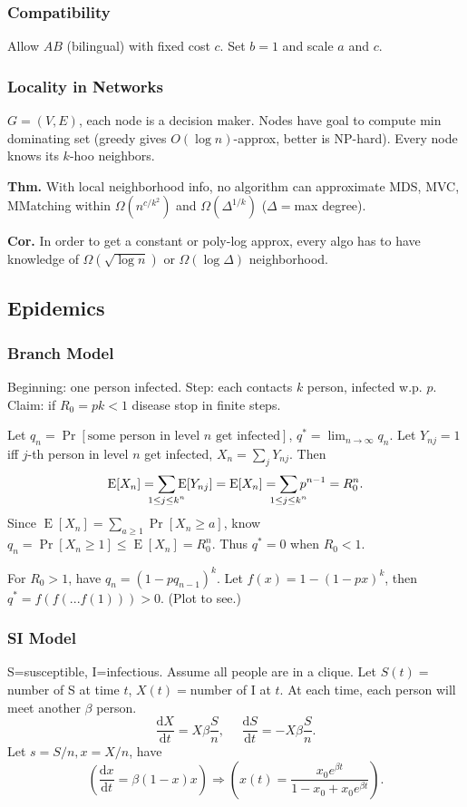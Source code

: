 \documentclass[a4paper,twocolumn,10pt]{article}
\newcommand{\pte}[1]{\left({#1}\right)}
\newcommand{\E}{\operatorname{E}}
\newcommand{\dd}{\mathrm{d}}
\begin{document}
	\subsubsection{Compatibility}
		Allow $AB$ (bilingual) with fixed cost $c$.
		Set $b=1$ and scale $a$ and $c$.
	
	\subsubsection{Locality in Networks}
		$G=(V,E)$, each node is a decision maker.
		Nodes have goal to compute min dominating set (greedy gives $O(\log n)$-approx,
			better is NP-hard).
		Every node knows its $k$-hoo neighbors.

		\textbf{Thm.}
		With local neighborhood info, no algorithm can approximate
			MDS, MVC, MMatching within $\Omega(n^{c/k^2})$ and $\Omega(\Delta^{1/k})$
			($\Delta=$max degree).

		\textbf{Cor.}
		In order to get a constant or poly-log approx, every algo has to  have knowledge
			of $\Omega(\sqrt{\log n})$ or $\Omega(\log \Delta)$ neighborhood.

\subsection{Epidemics}
	\subsubsection{Branch Model}
		Beginning: one person infected.
		Step: each contacts $k$ person, infected w.p. $p$.
		Claim: if $R_0=pk<1$ disease stop in finite steps.
		
		Let $q_n=\Pr[\textrm{some person in level $n$ get infected}]$,
		$q^*=\lim_{n\to\infty} q_n$.
		Let $Y_{nj}=1$ iff $j$-th person in level $n$ get infected,
			$X_n=\sum_j Y_{nj}$.
		Then 
		\[
			\E[X_n]=\sum_{\mathclap{1\le j\le k^{n}}} \E[Y_{nj}]=
			\E[X_n]=\sum_{\mathclap{1\le j\le k^{n}}} p^{n-1} = R_0^{n}.
		\]
		Since $\E[X_n]=\sum_{a\ge 1} \Pr[X_n\ge a]$,
			know $q_n=\Pr[X_n\ge 1]\le \E[X_n]=R_0^n$.
		Thus $q^*=0$ when $R_0<1$.
		
		For $R_0>1$, have $q_n=(1-p q_{n-1})^k$.
		Let $f(x)=1-(1-px)^k$, then $q^*=f(f(...f(1)))>0$. (Plot to see.)
	
	\subsubsection{SI Model}
		S=susceptible, I=infectious.
		Assume all people are in a clique.
		Let $S(t)=$number of S at time $t$, $X(t)=$number of I at $t$.
		At each time, each person will meet another $\beta$ person.
		\[
			\frac{\dd X}{\dd t} = X \beta \frac{S}{n},
			\textrm{~~~~}
			\frac{\dd S}{\dd t} = -X \beta \frac{S}{n}.
		\]
		Let $s=S/n,x=X/n$, have
		\[
			\pte{\frac{\dd x}{\dd t} = \beta(1-x)x}
			\Longrightarrow
			\pte{x(t)=\frac{x_0 e^{\beta t}}{1-x_0+x_0 e^{\beta t}}}.
		\]
	
\end{document}
